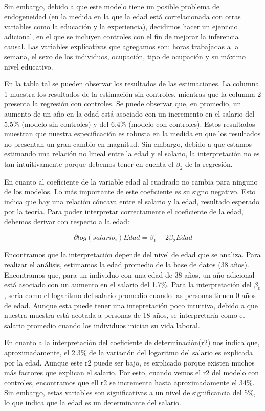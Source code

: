 \documentclass[
  11pt,
  letterpaper,
]{article}
\begin{document}
Sin embargo, debido a que este modelo tiene un posible problema de
endogeneidad (en la medida en la que la edad está correlacionada con
otras variables como la educación y la experiencia), decidimos hacer un
ejercicio adicional, en el que se incluyen controles con el fin de
mejorar la inferencia causal. Las variables explicativas que agregamos
son: horas trabajadas a la semana, el sexo de los individuos, ocupación,
tipo de ocupación y su máximo nivel educativo.

En la tabla tal se pueden observar los resultados de las estimaciones.
La columna 1 muestra los resultados de la estimación sin controles,
mientras que la columna 2 presenta la regresión con controles. Se puede
observar que, en promedio, un aumento de un año en la edad está asociado
con un incremento en el salario del 5.5\% (modelo sin controles) y del
6.4\% (modelo con controles). Estos resultados muestran que nuestra
especificación es robusta en la medida en que los resultados no
presentan un gran cambio en magnitud. Sin embargo, debido a que estamos
estimando una relación no lineal entre la edad y el salario, la
interpretación no es tan intuitivamente porque debemos tener en cuenta
el \(\beta_2\) de la regresión.

En cuanto al coeficiente de la variable edad al cuadrado no cambia para
ninguno de los modelos. Lo más importante de este coeficiente es su
signo negativo. Esto indica que hay una relación cóncava entre el
salario y la edad, resultado esperado por la teoría. Para poder
interpretar correctamente el coeficiente de la edad, debemos derivar con
respecto a la edad:

\[
\partial{log(salario_i)}{Edad}=\beta_1  +2 \beta_2 Edad
\]

Encontramos que la interpretación depende del nivel de edad que se
analiza. Para realizar el análisis, estimamos la edad promedio de la
base de datos (38 años). Encontramos que, para un individuo con una edad
de 38 años, un año adicional está asociado con un aumento en el salario
del 1.7\%. Para la interpretación del \(\beta_{0}\), sería como el
logaritmo del salario promedio cuando las personas tienen 0 años de
edad. Aunque esta puede tener una intepretación poco intuitiva, debido a
que nuestra muestra está acotada a personas de 18 años, se interpretaría
como el salario promedio cuando los individuos inician su vida laboral.

En cuanto a la interpretación del coeficiente de determinación(r2) nos
indica que, aproximadamente, el 2.3\% de la variación del logaritmo del
salario es explicada por la edad. Aunque este r2 puede ser bajo, es
explicado porque existen muchos más factores que explican el salario.
Por esto, cuando vemos el r2 del modelo con controles, encontramos que
ell r2 se incrementa hasta aproximadamente el 34\%. Sin embargo, estas
variables son significativas a un nivel de significancia del 5\%, lo que
indica que la edad es un determinante del salario.
\end{document}
